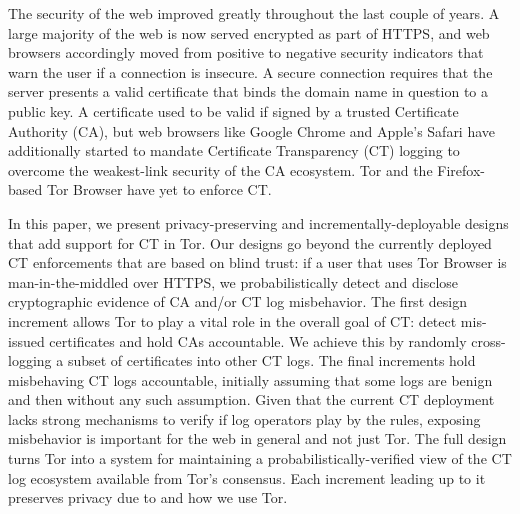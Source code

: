 The security of the web improved greatly throughout the last couple of years.
A large majority of the web is now served encrypted as part of HTTPS, and
web browsers accordingly moved from positive to negative security indicators
that warn the user if a connection is insecure.  A secure connection requires
that the server presents a valid certificate that binds the domain name in
question to a public key.  A certificate used to be valid if signed by a trusted
Certificate Authority (CA), but web browsers like Google Chrome and
Apple's Safari have additionally started to mandate Certificate Transparency (CT)
logging to overcome the weakest-link security of the CA ecosystem.  Tor and the
Firefox-based Tor Browser have yet to enforce CT.

\hspace{12pt}
In this paper, we present privacy-preserving and incrementally-deployable
designs that add support for CT in Tor. Our designs go beyond the currently
deployed CT enforcements that are based on blind trust:
	if a user that uses Tor Browser is man-in-the-middled over HTTPS,
	we probabilistically detect and disclose cryptographic evidence of CA and/or
	CT log misbehavior.
The first design increment allows Tor to play a vital role in the overall goal
of CT:
	detect mis-issued certificates and hold CAs accountable.
We achieve this by randomly cross-logging a subset of certificates into other CT
logs.  The final increments hold misbehaving CT logs accountable, initially
assuming that some logs are benign and then without any such assumption.
Given that the current CT deployment lacks strong mechanisms to verify if log
operators play by the rules, exposing misbehavior is important for the web in
general and not just Tor.  The full design turns Tor into a system for
maintaining a probabilistically-verified view of the CT log ecosystem available
from Tor's consensus.  Each increment leading up to it preserves privacy due to
and how we use Tor.
